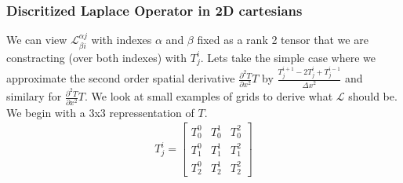 \documentclass{article}
\begin{document}
\subsubsection*{Discritized Laplace Operator in 2D cartesians}
We can view $\mathcal{L}^{\alpha j}_{\beta i}$ with indexes $\alpha$ and $\beta$ fixed as a rank 2 tensor that we are constracting (over both indexes) with $T^{i}_{j}$. 
\newline
Lets take the simple case where we approximate the second order spatial derivative $\frac{\partial^2 T}{\partial {x}^2} T$ by $\frac{T^{i+1}_{j} - 2 T^{i}_{j} + T^{i-1}_{j}}{{\Delta x}^2}$ and similary for $\frac{\partial^2 T}{\partial {x}^2} T$. We look at small examples of grids to derive what $\mathcal{L}$ should be. We begin with a 3x3 repressentation of $T$.
\begin{gather}
T^{i}_{j} = \begin{bmatrix}	T^{0}_{0} & T^{1}_{0} & T^{2}_{0} \\ T^{0}_{1} & T^{1}_{1} & T^{2}_{1} \\ T^{0}_{2} & T^{1}_{2} & T^{2}_{2} \end{bmatrix}
\end{gather}
\end{document}
